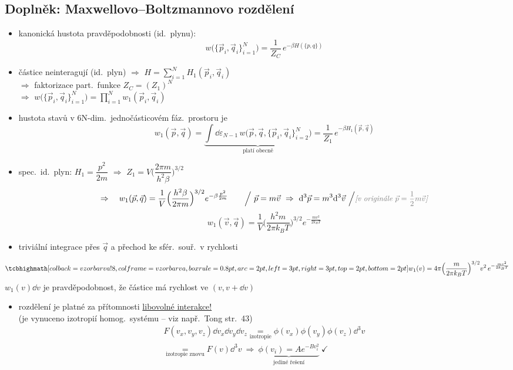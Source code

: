 \subsection{Doplněk: Maxwellovo--Boltzmannovo rozdělení}
\begin{itemize}
  \item kanonická hustota pravděpodobnosti (id.\ plynu):
  \[ w\big(\{\vec p_i,\vec q_i\}_{i=1}^N\big) = \frac{1}{Z_C}\,e^{-\beta H(\{p,q\})} \]
  \item částice neinteragují (id.\ plyn) $\Rightarrow$ $H = \sum_{i=1}^N H_1(\vec p_i,\vec q_i)$ \\
        $\Rightarrow$ faktorizace part.\ funkce $Z_C = (Z_1)^N$ \\
        $\Rightarrow$ $w\big(\{\vec p_i,\vec q_i\}_{i=1}^N\big) = \prod_{i=1}^N w_1(\vec p_i,\vec q_i)$
  \item hustota stavů v 6N-dim.\ jednočásticovém fáz.\ prostoru je
  \[
    w_1(\vec p,\vec q) = \underbrace{\int\dd\varepsilon_{N-1}\,w\big(\vec p,\vec q,\{\vec p_i,\vec q_i\}_{i=2}^N\big)}_{\text{platí obecně}}
    = \frac{1}{Z_1}\,e^{-\beta H_1(\vec p,\vec q)}
  \]
  \item spec.\ id.\ plyn: \quad $H_1 = \dfrac{p^2}{2m}$ \quad $\Rightarrow$ \quad $Z_1 = V\Big(\dfrac{2\pi m}{h^2\beta}\Big)^{3/2}$
  \[
    \Rightarrow\quad w_1(\vec p,\vec q) = \frac1V\Big(\frac{h^2\beta}{2\pi m}\Big)^{3/2}e^{-\beta\frac{p^2}{2m}}
    \qquad
    \Big/\ \vec p = m\vec v \ \Rightarrow\ \dd^3\vec p = m^3\dd^3\vec v\ \Big/
    \pozn{v originále $\vec p = \frac12 m\vec v$}
  \]
  \[
    w_1(\vec v,\vec q) = \frac1V\Big(\frac{h^2m}{2\pi k_BT}\Big)^{3/2}e^{-\frac{mv^2}{2k_BT}}
  \]
  \item triviální integrace přes $\vec q$ a přechod ke sfér.\ souř.\ v rychlosti
\end{itemize}

\begin{veta}
\[
  \vzorec{w_1(v) = 4\pi\Big(\frac{m}{2\pi k_BT}\Big)^{3/2}v^2\,e^{-\frac{mv^2}{2k_BT}}}
\]
$w_1(v)\dd v$ je pravděpodobnost, že částice má rychlost ve $(v,v+\dd v)$
\end{veta}

\begin{itemize}
  \item rozdělení je platné za přítomnosti \underline{libovolné interakce!} \\
        (je vynuceno izotropií homog.\ systému -- viz např.\ Tong str.~43)
  \begin{multline*}
    F(v_x,v_y,v_z)\dd v_x\dd v_y\dd v_z \underset{\text{izotropie}}{=} \phi(v_x)\phi(v_y)\phi(v_z)\dd^3v \\
    \underset{\text{izotropie znovu}}{=} F(v)\dd^3v
    \ \Rightarrow\ \underbrace{\phi(v_i) = Ae^{-Bv_i^2}}_{\text{jediné řešení}} \ \checkmark
  \end{multline*}
\end{itemize}

